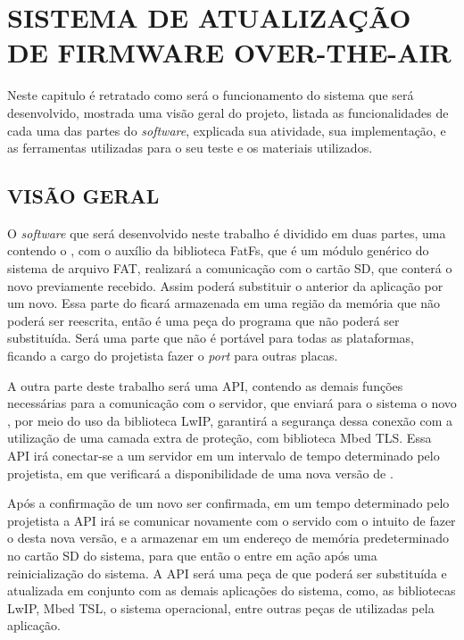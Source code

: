 
\chapter{SISTEMA DE ATUALIZAÇÃO DE FIRMWARE OVER-THE-AIR}
\label{chap:metodologia}
Neste capitulo é retratado como será o funcionamento do sistema que será desenvolvido, mostrada uma visão geral do projeto, listada as funcionalidades de cada uma das partes do \textit{software}, explicada sua atividade, sua implementação, e as ferramentas utilizadas para o seu teste e os materiais utilizados. 

\section{VISÃO GERAL}
O \textit{software} que será desenvolvido neste trabalho é dividido em duas partes, uma contendo o \bootloader, com o auxílio da biblioteca FatFs, que é um módulo genérico do sistema de arquivo FAT, realizará a comunicação com o cartão SD, que conterá o novo \firmware previamente recebido. Assim poderá substituir o \software anterior da aplicação por um novo. Essa parte do \software ficará armazenada em uma região da memória que não poderá ser reescrita, então é uma peça do programa que não poderá ser substituída. Será uma parte que não é portável para todas as plataformas, ficando a cargo do projetista fazer o \textit{port} para outras placas.

A outra parte deste trabalho será uma API, contendo as demais funções necessárias para a comunicação com o servidor, que enviará para o sistema o novo \firmware, por meio do uso da biblioteca LwIP, garantirá a segurança dessa conexão com a utilização de uma camada extra de proteção, com biblioteca Mbed TLS. Essa API irá conectar-se a um servidor em um intervalo de tempo determinado pelo projetista, em que verificará a disponibilidade de uma nova versão de \software. 

Após a confirmação de um novo \firmware ser confirmada, em um tempo determinado pelo projetista a API irá se comunicar novamente com o servido com o intuito de fazer o \download desta nova versão, e a armazenar em um endereço de memória predeterminado no cartão SD do sistema, para que então o \bootloader entre em ação após uma reinicialização do sistema.
A API será uma peça de \software que poderá ser substituída e atualizada em conjunto com as demais aplicações do sistema, como, as bibliotecas LwIP, Mbed TSL, o sistema operacional, entre outras peças de \software utilizadas pela aplicação. 

